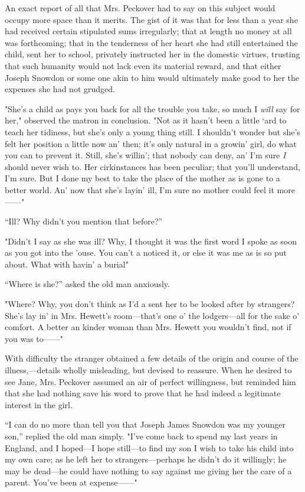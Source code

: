 An exact report of all that Mrs. Peckover had to say on this subject
would occupy more space than it merits. The gist of it was that for less
than a year she had received certain stipulated sums irregularly; that
at length no money at all was forthcoming; that in the tenderness of her
heart she had still entertained the child, sent her to school, privately
instructed her in the domestic virtues, trusting that such humanity
would not lack even its material reward, and that either Joseph
{\protect\hypertarget{114}{}{}}Snowdon or some one akin to him would
ultimately make good to her the expenses she had not grudged.

"She's a child as pays you back for all the trouble you take, so much I
\emph{will} say for her," observed the matron in conclusion. "Not as it
hasn't been a little `ard to teach her tidiness, but she's only a young
thing still. I shouldn't wonder but she's felt her position a little now
an' then; it's only natural in a growin' girl, do what you can to
prevent it. Still, she's willin'; that nobody can deny, an' I'm sure
\emph{I} should never wish to. Her cirkinstances has been peculiar; that
you'll understand, I'm sure. But I done my best to take the place of the
mother as is gone to a better world. An' now that she's layin' ill, I'm
sure no mother could feel it more{{------}}"

``Ill? Why didn't you mention that before?''

"Didn't I say as she was ill? Why, I thought it was the first word I
spoke as soon as you got into the 'ouse. You can't a
{\protect\hypertarget{115}{}{}}noticed it, or else it was me as is so
put about. What with havin' a burial"

``Where is she?'' asked the old man anxiously.

"Where? Why, you don't think as I'd a sent her to be looked after by
strangers? She's lay in' in Mrs. Hewett's room---that's one o' the
lodgers---all for the sake o' comfort. A better an kinder woman than
Mrs. Hewett you wouldn't find, not if you was to{{------}}"

With difficulty the stranger obtained a few details of the origin and
course of the illness,---details wholly misleading, but devised to
reassure. When he desired to see Jane, Mrs. Peckover assumed an air of
perfect willingness, but reminded him that she had nothing save his word
to prove that he had indeed a legitimate interest in the girl.

``I can do no more than tell you that Joseph James Snowdon was my
younger son,'' replied the old man simply. "I've come back to spend my
last years in England, and I hoped---I hope still---to find my son
{\protect\hypertarget{116}{}{}}I wish to take his child into my own
care; as he left her to strangers---perhaps he didn't do it willingly;
he may be dead---he could have nothing to say against me giving her the
care of a parent. You've been at expense{{------}}"

